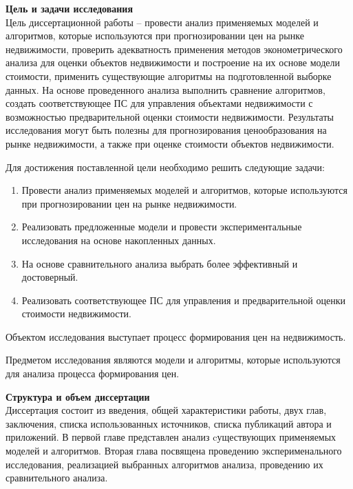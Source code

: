 \label{sec:general_description}

\textbf{Цель и задачи исследования}\\

Цель диссертационной работы – провести анализ применяемых моделей и алгоритмов, которые используются при
прогнозировании цен на рынке недвижимости, проверить адекватность применения методов эконометрического
анализа для оценки объектов недвижимости и построение на их основе модели стоимости, применить существующие алгоритмы на
подготовленной выборке данных.
На основе проведенного анализа выполнить сравнение алгоритмов, создать соответствующее ПС для управления объектами
недвижимости с возможностью предварительной оценки стоимости недвижимости.
Результаты исследования могут быть полезны для прогнозирования
ценообразования на рынке недвижимости, а также при оценке стоимости объектов недвижимости.

Для достижения поставленной цели необходимо решить следующие задачи:
\begin{enumerate}
  \item Провести анализ применяемых моделей и алгоритмов, которые используются при прогнозировании цен на рынке недвижимости.
  \item Реализовать предложенные модели и провести экспериментальные исследования на основе накопленных данных.
  \item На основе сравнительного анализа выбрать более эффективный и достоверный.
  \item Реализовать соответствующее ПС для управления и предварительной оценки стоимости недвижимости.
\end{enumerate}

Объектом исследования выступает процесс формирования цен \linebreak на недвижимость.

Предметом исследования являются модели и алгоритмы, которые используются для анализа процесса формирования цен.


\textbf{Структура и объем диссертации}\\

Диссертация состоит из введения, общей характеристики работы, двух глав, заключения, списка использованных источников,
списка публикаций автора и приложений. В первой главе представлен анализ cуществующих применяемых моделей и алгоритмов.
Вторая глава посвящена проведению эксперименального исследования, реализацией выбранных алгоритмов анализа, проведению
их сравнительного анализа.
